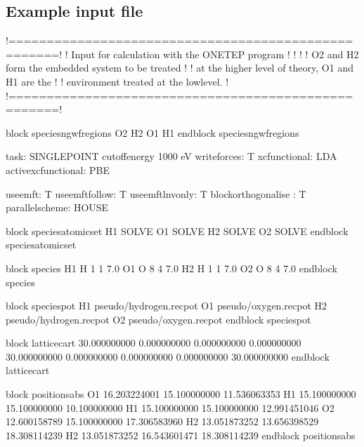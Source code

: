 \documentclass[letterpaper,10pt,english]{sphinxmanual}
\begin{document}
\subsection{Example input file}
\label{\detokenize{EMFT_in_ONETEP:example-input-file}}
%
\begin{sphinxVerbatim}[commandchars=\\\{\}]
!====================================================!
! Input for calculation with the ONETEP program      !
!                                                    !
! O2 and H2 form the embedded system to be treated   !
! at the higher level of theory, O1 and H1 are the   !
! environment treated at the low\PYGZhy{}level.              !
!====================================================!

\PYGZpc{}block species\PYGZus{}ngwf\PYGZus{}regions
O2 H2
O1 H1
\PYGZpc{}endblock species\PYGZus{}ngwf\PYGZus{}regions

task: SINGLEPOINT
cutoff\PYGZus{}energy 1000 eV
write\PYGZus{}forces: T
xc\PYGZus{}functional: LDA
active\PYGZus{}xc\PYGZus{}functional: PBE

use\PYGZus{}emft: T
use\PYGZus{}emft\PYGZus{}follow: T
use\PYGZus{}emft\PYGZus{}lnv\PYGZus{}only: T
block\PYGZus{}orthogonalise : T
parallel\PYGZus{}scheme: HOUSE

\PYGZpc{}block species\PYGZus{}atomic\PYGZus{}set
H1 \PYGZdq{}SOLVE\PYGZdq{}
O1 \PYGZdq{}SOLVE\PYGZdq{}
H2 \PYGZdq{}SOLVE\PYGZdq{}
O2 \PYGZdq{}SOLVE\PYGZdq{}
\PYGZpc{}endblock species\PYGZus{}atomic\PYGZus{}set

\PYGZpc{}block species
H1 H 1 1 7.0
O1 O 8 4 7.0
H2 H 1 1 7.0
O2 O 8 4 7.0
\PYGZpc{}endblock species

\PYGZpc{}block species\PYGZus{}pot
H1 \PYGZdq{}pseudo/hydrogen.recpot\PYGZdq{}
O1 \PYGZdq{}pseudo/oxygen.recpot\PYGZdq{}
H2 \PYGZdq{}pseudo/hydrogen.recpot\PYGZdq{}
O2 \PYGZdq{}pseudo/oxygen.recpot\PYGZdq{}
\PYGZpc{}endblock species\PYGZus{}pot

\PYGZpc{}block lattice\PYGZus{}cart
     30.000000000       0.000000000       0.000000000
      0.000000000      30.000000000       0.000000000
      0.000000000       0.000000000      30.000000000
\PYGZpc{}endblock lattice\PYGZus{}cart

\PYGZpc{}block positions\PYGZus{}abs
O1       16.203224001     15.100000000     11.536063353
H1       15.100000000     15.100000000     10.100000000
H1       15.100000000     15.100000000     12.991451046
O2       12.600158789     15.100000000     17.306583960
H2       13.051873252     13.656398529     18.308114239
H2       13.051873252     16.543601471     18.308114239
\PYGZpc{}endblock positions\PYGZus{}abs
\end{sphinxVerbatim}
\end{document}
